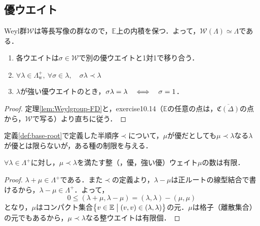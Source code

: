 \documentclass[rep_main]{subfiles}
\begin{document}
\subsection{優ウエイト}
Weyl群$\mathscr{W}$は等長写像の群なので，$\mathbb{E}$上の内積を保つ．よって，$\mathscr{W}(\Lambda) \simeq \Lambda$である．
\begin{mylem}[label=lem:dom-weight-A]{}
	\begin{enumerate}
		\item 各ウエイトは$\sigma \in \mathscr{W}$で別の優ウエイトと1対1で移り合う．
		\item $\forall \lambda \in \Lambda_\text{w}^+,\ \forall \sigma \in \lambda,\quad  \sigma\lambda \prec \lambda$
		\item $\lambda$が強い優ウエイトのとき，$\sigma\lambda = \lambda  \quad \Longleftrightarrow \quad  \sigma = 1$．
	\end{enumerate}
\end{mylem}
\begin{proof}
	定理\ref{lem:Weylgroup-FD}と，exercise10.14（$\mathbb{E}$の任意の点は，$\overline{\mathfrak{C}(\Delta)}$の点から，$\mathscr{W}$で写る）より直ちに従う．
\end{proof}
定義\ref{def:base-root}で定義した半順序$\prec$について，$\mu$が優だとしても$\mu \prec \lambda$なる$\lambda$が優とは限らないが，ある種の制限を与える．
\begin{mylem}[label=lem:dom-weight-B]{}
	$\forall \lambda \in \Lambda^+$に対し，$\mu \prec \lambda$を満たす整（，優，強い優）ウェイト$\mu$の数は有限．
\end{mylem}
\begin{proof}
	$\lambda + \mu \in \Lambda^+$である．また$\prec$の定義より，$\lambda - \mu$は正ルートの線型結合で書けるから，$\lambda - \mu \in \Lambda^+$．よって，
	\begin{equation}
		0 \leq (\lambda + \mu, \lambda - \mu) = (\lambda, \lambda) - (\mu, \mu)
	\end{equation}
	となり，$\mu$はコンパクト集合$\bigl\{v \in \mathbb{E} \bigm| (v, v) \in (\lambda, \lambda)\bigr\}$の元．$\mu$は格子（離散集合）の元でもあるから，$\mu \prec \lambda$なる整ウエイトは有限個．
\end{proof}
\end{document}
